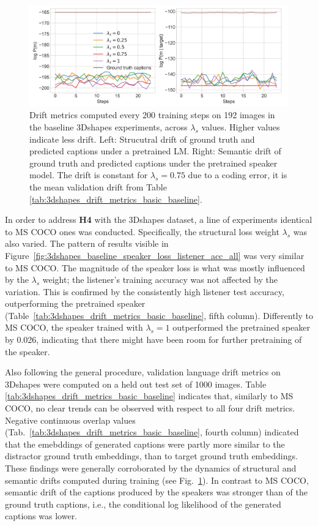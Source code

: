 \begin{figure}[h]
	\centering
	\includegraphics[width=\linewidth]{images/shapes_structural_semantic_drift_49_pure_L_s_all_random.png}
	\caption{Drift metrics computed every 200 training steps on 192 images in the baseline 3Dshapes experiments, across $\lambda_s$ values. Higher values indicate less drift. Left: Strucutral drift of ground truth and predicted captions under a pretrained LM. Right: Semantic drift of ground truth and predicted captions under the pretrained speaker model. The drift is constant for $\lambda_s = 0.75$ due to a coding error, it is the mean validation drift from Table \ref{tab:3dshapes_drift_metrics_basic_baseline}.} 
	\label{fig:3dshapes_baseline_all_str_sem_drift}
\end{figure}

In order to address \textbf{H4} with the 3Dshapes dataset, a line of experiments identical to MS COCO ones was conducted. Specifically, the structural loss weight $\lambda_s$ was also varied. The pattern of results visible in Figure~\ref{fig:3dshapes_baseline_speaker_loss_listener_acc_all} was very similar to MS COCO. The magnitude of the speaker loss is what was mostly influenced by the $\lambda_s$ weight; the listener's training accuracy was not affected by the variation. This is confirmed by the consistently high listener test accuracy, outperforming the pretrained speaker (Table~\ref{tab:3dshapes_drift_metrics_basic_baseline}, fifth column). Differently to MS COCO, the speaker trained with $\lambda_s = 1$ outperformed the pretrained speaker by 0.026, indicating that there might have been room for further pretraining of the speaker. 

Also following the general procedure, validation language drift metrics on 3Dshapes were computed on a held out test set of 1000 images. Table \ref{tab:3dshapes_drift_metrics_basic_baseline} indicates that, similarly to MS COCO, no clear trends can be observed with respect to all four drift metrics. Negative continuous overlap values (Tab.~\ref{tab:3dshapes_drift_metrics_basic_baseline}, fourth column) indicated that the emebddings of generated captions were partly more similar to the distractor ground truth embeddings, than to target ground truth embeddings. These findings were generally corroborated by the dynamics of structural and semantic drifts computed during training (see Fig.~\ref{fig:3dshapes_baseline_all_str_sem_drift}). In contrast to MS COCO, semantic drift of the captions produced by the speakers was stronger than of the ground truth captions, i.e., the conditional log likelihood of the generated captions was lower. 

